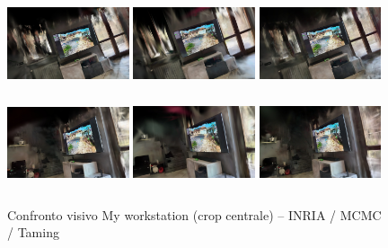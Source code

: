 \begin{figure}[ht]
	\centering
	\includegraphics[width=0.32\textwidth,height=2.8cm,trim={80 40 80 40},clip]{images/benchmarks/my_workstation_inria_balanced_1.jpg}
	\includegraphics[width=0.32\textwidth,height=2.8cm,trim={80 40 80 40},clip]{images/benchmarks/my_workstation_mcmc_balanced_1.jpg}
	\includegraphics[width=0.32\textwidth,height=2.8cm,trim={80 40 80 40},clip]{images/benchmarks/my_workstation_taming_balanced_1.jpg}
		\includegraphics[width=0.32\textwidth,height=2.8cm,trim={80 40 80 40},clip]{images/benchmarks/my_workstation_inria_balanced_2.jpg}
	\includegraphics[width=0.32\textwidth,height=2.8cm,trim={80 40 80 40},clip]{images/benchmarks/my_workstation_mcmc_balanced_2.jpg}
	\includegraphics[width=0.32\textwidth,height=2.8cm,trim={80 40 80 40},clip]{images/benchmarks/my_workstation_taming_balanced_2.jpg}
	\caption{Confronto visivo My workstation (crop centrale) -- INRIA / MCMC / Taming}
	\label{fig:my_workstation_comparison}
\end{figure}



